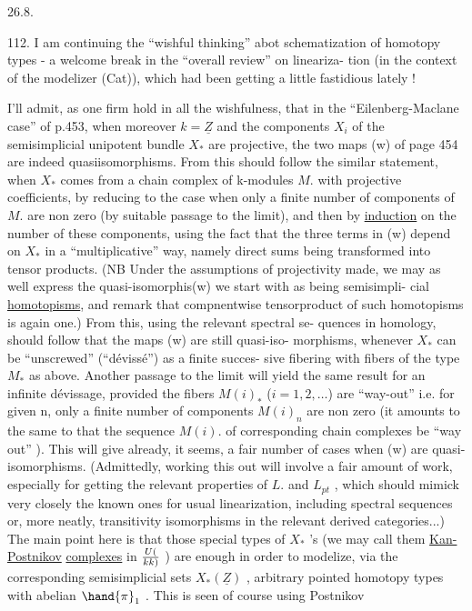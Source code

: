 
26.8.

112. I am continuing the ``wishful thinking'' abot schematization of
homotopy types - a welcome break in the ``overall review'' on lineariza-%
tion  (in the context of the modelizer (Cat)), which had been getting
a little fastidious lately !

I'll admit, as one firm hold in all the wishfulness, that in the
``Eilenberg-Maclane case'' of p.453, when moreover $k=\underline{Z}$ and the components
$X_i$ of the semisimplicial unipotent bundle $X_*$ are projective, the two
maps (w) of page 454 are indeed quasiisomorphisms. From this should
follow the similar statement, when $X_*$ comes from a chain complex of
k-modules $M.$ with projective coefficients, by reducing to the case
when only a finite number of components of $M.$ are non zero (by suitable
\margin{\unsure{!}} passage to the limit), and then by \uline{induction} on the number of these
components, using the fact that the three terms in (w) depend on $X_*$ in
a ``multiplicative'' way, namely direct sums being transformed into tensor
products. (NB Under the assumptions of projectivity made, we may as
well express the quasi-isomorphis(w) we start with as being semisimpli-%
cial \uline{homotopisms}, and remark that compnentwise tensorproduct of such
homotopisms is again one.) From this, using the relevant spectral se-%
quences in homology, should follow that the maps (w) are still quasi-iso-%
morphisms, whenever $X_*$ can be ``unscrewed'' (``dévissé'') as a finite succes-%
sive fibering with fibers of the type $M_*$ as above. Another passage to
the limit will yield the same result for an infinite dévissage, provided
the fibers $M(i)_*$ ($i=1,2, \ldots$) are ``way-out'' i.e. for given n, only
a finite number of components $M(i)_n$ are non zero (it amounts to the
same to  that the sequence $M(i).$ of corresponding chain complexes
be ``way out'' ). This will give already, it seems, a fair number of
cases when (w) are quasi-isomorphisms. (Admittedly, working this out will
involve a fair amount of work, especially for getting the relevant
properties of $L.$ and $L_{pt}$ , which should mimick very closely the known
ones for usual linearization, including spectral sequences or, more
neatly, transitivity isomorphisms in the relevant derived categories...)
The main point here is that those special types of $X_*$ 's (we may call
them \uline{Kan-Postnikov} \uline{complexes} in $U(\over{k}{k})$ ) are enough in order to modelize,
via the corresponding semisimplicial sets $X_*(\underline{Z})$ , arbitrary  pointed
homotopy types with abelian $\hand{\pi}_1$ . This is seen of course using Postnikov

